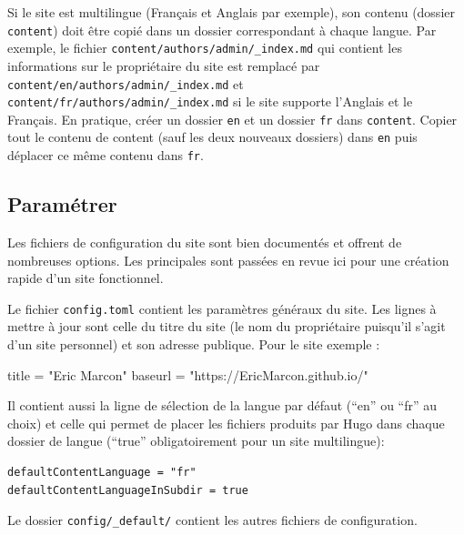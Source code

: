 \documentclass[
  11pt,
  french,
  a4paper,
  extrafontsizes,onecolumn,openright
  ]{memoir}
\newenvironment{Shaded}{\begin{snugshade}}{\end{snugshade}}
\newcommand{\NormalTok}[1]{#1}
\newcommand{\OtherTok}[1]{\textcolor[rgb]{0.56,0.35,0.01}{#1}}
\newcommand{\StringTok}[1]{\textcolor[rgb]{0.31,0.60,0.02}{#1}}
\begin{document}
Si le site est multilingue (Français et Anglais par exemple), son contenu (dossier \texttt{content}) doit être copié dans un dossier correspondant à chaque langue.
Par exemple, le fichier \texttt{content/authors/admin/\_index.md} qui contient les informations sur le propriétaire du site est remplacé par \texttt{content/en/authors/admin/\_index.md} et \texttt{content/fr/}\break\texttt{authors/admin/\_index.md} si le site supporte l'Anglais et le Français.
En pratique, créer un dossier \texttt{en} et un dossier \texttt{fr} dans \texttt{content}.
Copier tout le contenu de content (sauf les deux nouveaux dossiers) dans \texttt{en} puis déplacer ce même contenu dans \texttt{fr}.

\hypertarget{paramuxe9trer}{%
\subsection{Paramétrer}\label{paramuxe9trer}}

Les fichiers de configuration du site sont bien documentés et offrent de nombreuses options.
Les principales sont passées en revue ici pour une création rapide d'un site fonctionnel.

Le fichier \texttt{config.toml} contient les paramètres généraux du site.
Les lignes à mettre à jour sont celle du titre du site (le nom du propriétaire puisqu'il s'agit d'un site personnel) et son adresse publique.
Pour le site exemple :

\scriptsize

\begin{Shaded}
\begin{Highlighting}[]
\NormalTok{title }\OtherTok{=} \StringTok{"Eric Marcon"}
\NormalTok{baseurl }\OtherTok{=} \StringTok{"https://EricMarcon.github.io/"}
\end{Highlighting}
\end{Shaded}

\normalsize

Il contient aussi la ligne de sélection de la langue par défaut (``en'' ou ``fr'' au choix) et celle qui permet de placer les fichiers produits par Hugo dans chaque dossier de langue (``true'' obligatoirement pour un site multilingue):

\begin{verbatim}
defaultContentLanguage = "fr"
defaultContentLanguageInSubdir = true
\end{verbatim}

Le dossier \texttt{config/\_default/} contient les autres fichiers de configuration.
\end{document}

